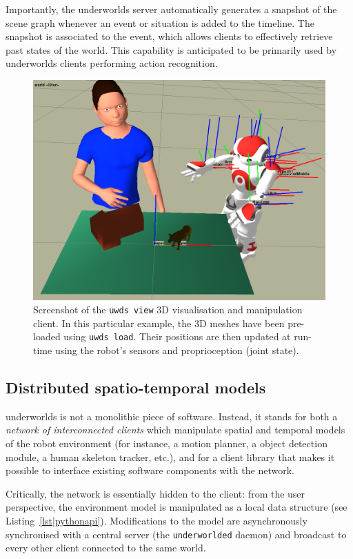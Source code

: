 \documentclass[letterpaper, 10pt, conference]{ieeeconf}
\newcommand{\uwds}{{\sc underworlds}\xspace}
\begin{document}
Importantly, the \uwds server automatically generates a snapshot of
the scene graph whenever an event or situation is added to the timeline. The
snapshot is associated to the event, which allows clients to effectively retrieve past
states of the world. This capability is anticipated to be primarily used by \uwds clients
performing action recognition.

\begin{figure}
    \centering
    \includegraphics[width=\linewidth]{uwds-screenshot}
    \caption{Screenshot of the {\tt uwds view} 3D visualisation and manipulation
    client. In this particular example, the 3D meshes have been pre-loaded using
    {\tt uwds load}. Their positions are then updated at run-time using the
    robot's sensors and proprioception (joint state).}
    \label{fig|uwds-view}
\end{figure}

\subsection{Distributed spatio-temporal models}
\label{arch}

\uwds is not a monolithic piece of software. Instead, it stands for both a
\emph{network of interconnected clients} which manipulate spatial and temporal
models of the robot environment (for instance, a motion planner, a object
detection module, a human skeleton tracker, etc.), and for a {client library}
that makes it possible to interface existing software components with the network.

Critically, the network is essentially hidden to the client: from the user
perspective, the environment model is manipulated as a local data structure (see
Listing~\ref{lst|pythonapi}). Modifications to the model are asynchronously synchronised with
a central server (the {\tt underworlded} daemon) and broadcast to every other
client connected to the same world.
\end{document}
